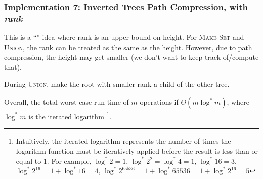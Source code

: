 \subsubsection{Implementation 7: Inverted Trees Path Compression, with \textit{rank}}

This is a ``'' idea where rank is an upper bound on height. For \textsc{Make-Set} and \textsc{Union}, the rank can be treated as the same as the height. However, due to path compression, the height may get smaller (we don't want to keep track of/compute that).

During \textsc{Union}, make the root with smaller rank a child of the other tree.


Overall, the total worst case run-time of $m$ operations if $\Theta(m \log^* m)$, where $\log^* m$ is the iterated logarithm \footnote{Intuitively, the iterated logarithm represents the number of times the logarithm function must be iteratively applied before the result is less than or equal to 1. For example, $\log^*2 = 1$, $\log^*2^2 = \log^*4 = 1$, $\log^*16 = 3$, $\log^* 2^{16} = 1 + \log^*{16} = 4$, $\log^* 2^{65536} = 1 + \log^* 65536 = 1 + \log^* 2^{16} = 5$}. 